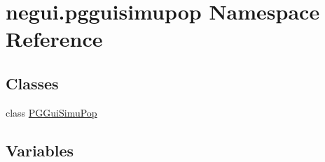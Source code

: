 \hypertarget{namespacenegui_1_1pgguisimupop}{}\section{negui.\+pgguisimupop Namespace Reference}
\label{namespacenegui_1_1pgguisimupop}
\subsection*{Classes}
\begin{DoxyCompactItemize}
\item 
class \hyperlink{classnegui_1_1pgguisimupop_1_1PGGuiSimuPop}{P\+G\+Gui\+Simu\+Pop}
\end{DoxyCompactItemize}
\subsection*{Variables}
